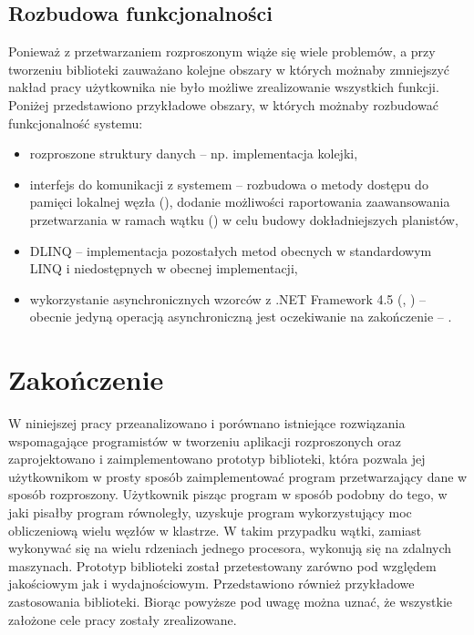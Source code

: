 \subsection{Rozbudowa funkcjonalności}

Ponieważ z przetwarzaniem rozproszonym wiąże się wiele problemów,
a przy tworzeniu biblioteki zauważano kolejne obszary w których możnaby
zmniejszyć nakład pracy użytkownika nie było możliwe zrealizowanie
wszystkich funkcji. Poniżej przedstawiono przykładowe obszary, w których
możnaby rozbudować funkcjonalność systemu:
\begin{itemize}
\item rozproszone struktury danych -- np. implementacja kolejki,
\item interfejs do komunikacji z systemem -- rozbudowa o metody dostępu
do pamięci lokalnej węzła (), dodanie możliwości
raportowania zaawansowania przetwarzania w ramach wątku ()
w celu budowy dokładniejszych planistów,
\item DLINQ -- implementacja pozostałych metod obecnych w standardowym LINQ
i niedostępnych w obecnej implementacji,
\item wykorzystanie asynchronicznych wzorców z .NET Framework 4.5 (,
) -- obecnie jedyną operacją asynchroniczną jest oczekiwanie
na zakończenie  -- .
\end{itemize}

\section{Zakończenie}

W niniejszej pracy przeanalizowano i porównano istniejące rozwiązania
wspomagające programistów w tworzeniu aplikacji rozproszonych oraz
zaprojektowano i zaimplementowano prototyp biblioteki, która pozwala
jej użytkownikom w prosty sposób zaimplementować program przetwarzający
dane w sposób rozproszony. Użytkownik pisząc program w sposób podobny
do tego, w jaki pisałby program równoległy, uzyskuje program wykorzystujący
moc obliczeniową wielu węzłów w klastrze. W takim przypadku wątki,
zamiast wykonywać się na wielu rdzeniach jednego procesora, wykonują
się na zdalnych maszynach. Prototyp biblioteki został przetestowany
zarówno pod względem jakościowym jak i wydajnościowym. Przedstawiono
również przykładowe zastosowania biblioteki. Biorąc powyższe pod uwagę
można uznać, że wszystkie założone cele pracy zostały zrealizowane.
